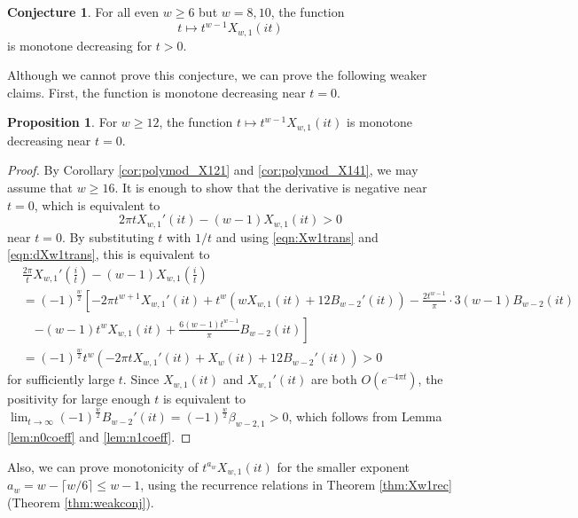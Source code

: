 \documentclass[10pt,reqno]{amsproc}
\newcommand{\1}{\mathds{1}}	%
\theoremstyle{definition}
\newtheorem{proposition}[theorem]{Proposition}
\newtheorem{conjecture}[theorem]{Conjecture}
\theoremstyle{remark}
\begin{document}
\begin{conjecture}
    \label{conj:Xw1mono}
    For all even $w \ge 6$ but $w = 8, 10$, the function 
    \[
    t \mapsto t^{w-1} X_{w, 1}(it)
    \]
    is monotone decreasing for $t > 0$.
\end{conjecture}
Although we cannot prove this conjecture, we can prove the following weaker claims.
First, the function is monotone decreasing near $t = 0$.

\begin{proposition}
    \label{prop:Xw1monot0}
    For $w \ge 12$, the function $t \mapsto t^{w-1} X_{w, 1}(it)$ is monotone decreasing near $t = 0$.
\end{proposition}
\begin{proof}
    By Corollary \ref{cor:polymod_X121} and \ref{cor:polymod_X141}, we may assume that $w \ge 16$.
    It is enough to show that the derivative is negative near $t = 0$, which is equivalent to
    \[
    2 \pi t X_{w, 1}'(it) - (w-1) X_{w, 1}(it) > 0
    \]
    near $t = 0$.
    By substituting $t$ with $1/t$ and using \eqref{eqn:Xw1trans} and \eqref{eqn:dXw1trans}, this is equivalent to
    \begin{align*}
        &\frac{2\pi}{t} X_{w, 1}'\left(\frac{i}{t}\right) - (w-1) X_{w, 1}\left(\frac{i}{t}\right) \\
        &= (-1)^{\frac{w}{2}} \left[-2 \pi t^{w+1} X_{w,1}'(it) + t^w \left(w X_{w, 1}(it) + 12 B_{w-2}'(it)\right) - \frac{2t^{w-1}}{\pi}\cdot 3(w-1) B_{w-2}(it) \right. \\
        &\quad\left.- (w-1)t^w X_{w, 1}(it) + \frac{6(w-1)t^{w-1}}{\pi}B_{w-2}(it)\right] \\
        &= (-1)^{\frac{w}{2}} t^w \left( -2 \pi t X_{w, 1}'(it) + X_w(it) + 12 B_{w-2}'(it)\right) > 0
    \end{align*}
    for sufficiently large $t$.
    Since $X_{w, 1}(it)$ and $X_{w, 1}'(it)$ are both $O(e^{-4 \pi t})$, the positivity for large enough $t$ is equivalent to $\lim_{t \to \infty} (-1)^{\frac{w}{2}} B_{w-2}'(it) = (-1)^{\frac{w}{2}} \beta_{w-2,1} > 0$, which follows from Lemma \ref{lem:n0coeff} and \ref{lem:n1coeff}.
\end{proof}
Also, we can prove monotonicity of $t^{a_w} X_{w, 1}(it)$ for the smaller exponent $a_w = w - \lceil w/6 \rceil \le w - 1$, using the recurrence relations in Theorem \ref{thm:Xw1rec} (Theorem \ref{thm:weakconj}).
\end{document}
